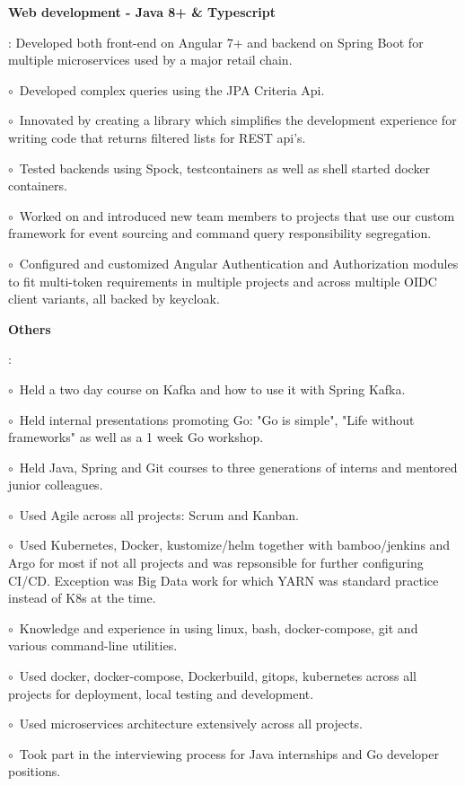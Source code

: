 \documentclass[letterpaper,11pt]{article}
\newcommand{\resumeItem}[2]{
  \item\small{
    \textbf{#1}{: #2 \vspace{-2pt}}
  }
}
\renewcommand{\labelitemii}{$\circ$}
\begin{document}
        \resumeItem{Web development - Java 8+ \& Typescript}{
	  Developed both front-end on Angular 7+ and backend on Spring Boot for multiple microservices used by a major retail chain. 

	  \labelitemii \ Developed complex queries using the JPA Criteria Api. 

	  \labelitemii \ Innovated by creating a library which simplifies the development experience for writing code that returns filtered lists for REST api's.

	  \labelitemii \ Tested backends using Spock, testcontainers as well as shell started docker containers. 


	  \labelitemii \ Worked on and introduced new team members to projects that use our custom framework for event sourcing and command query responsibility segregation.  

	  \labelitemii \ Configured and customized Angular Authentication and Authorization modules to fit multi-token requirements 
	  in multiple projects and across multiple OIDC client variants, all backed by keycloak.

	\resumeItem{Others} {

	  \labelitemii \ Held a two day course on Kafka and how to use it with Spring Kafka.
	
	  \labelitemii \ Held internal presentations promoting Go: "Go is simple", "Life without frameworks" as well as a 1 week Go workshop.  
	  
	  \labelitemii \ Held Java, Spring and Git courses to three generations of interns and mentored junior colleagues.

	  \labelitemii \ Used Agile across all projects: Scrum and Kanban.

	  \labelitemii \ Used Kubernetes, Docker, kustomize/helm together with bamboo/jenkins and Argo for most if not all projects and was repsonsible for further configuring CI/CD. Exception was Big Data work for which YARN was standard practice instead of K8s at the time.

	  \labelitemii \ Knowledge and experience in using linux, bash, docker-compose, git and various command-line utilities.

	  \labelitemii \ Used docker, docker-compose, Dockerbuild, gitops, kubernetes across all projects for deployment, 
	  local testing and development.

	  \labelitemii \ Used microservices architecture extensively across all projects.

	  \labelitemii \ Took part in the interviewing process for Java internships and Go developer positions.
	}
}
\end{document}
